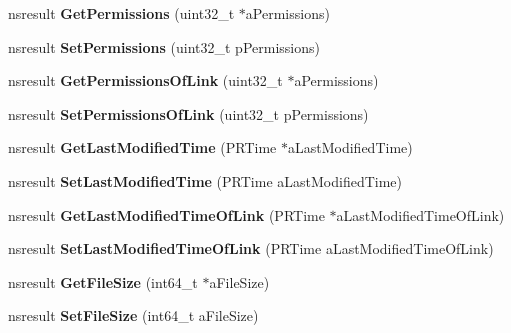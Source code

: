 \begin{DoxyCompactItemize}
\item 
\mbox{\label{interfacens_i_file_adbab0d3ced90584edfca30fc212f0716}} 
nsresult {\bfseries Get\+Permissions} (uint32\+\_\+t $\ast$a\+Permissions)
\item 
\mbox{\label{interfacens_i_file_ab5b46f4da2f272e127a2f1a8dc68524d}} 
nsresult {\bfseries Set\+Permissions} (uint32\+\_\+t p\+Permissions)
\item 
\mbox{\label{interfacens_i_file_a0657ef6dbcecd56e530e410ac0842438}} 
nsresult {\bfseries Get\+Permissions\+Of\+Link} (uint32\+\_\+t $\ast$a\+Permissions)
\item 
\mbox{\label{interfacens_i_file_aeed56ce8dd56464e30c66a38de735c31}} 
nsresult {\bfseries Set\+Permissions\+Of\+Link} (uint32\+\_\+t p\+Permissions)
\item 
\mbox{\label{interfacens_i_file_a9ac3d22e3d07148925df011857117a43}} 
nsresult {\bfseries Get\+Last\+Modified\+Time} (P\+R\+Time $\ast$a\+Last\+Modified\+Time)
\item 
\mbox{\label{interfacens_i_file_ababe92f89df28490b61cc584898d02a1}} 
nsresult {\bfseries Set\+Last\+Modified\+Time} (P\+R\+Time a\+Last\+Modified\+Time)
\item 
\mbox{\label{interfacens_i_file_a78799e23265cf32eaf2bbd5ed9007ae4}} 
nsresult {\bfseries Get\+Last\+Modified\+Time\+Of\+Link} (P\+R\+Time $\ast$a\+Last\+Modified\+Time\+Of\+Link)
\item 
\mbox{\label{interfacens_i_file_a13cb4a875feb91ef671fc3f360a383e1}} 
nsresult {\bfseries Set\+Last\+Modified\+Time\+Of\+Link} (P\+R\+Time a\+Last\+Modified\+Time\+Of\+Link)
\item 
\mbox{\label{interfacens_i_file_a6e9cd0e3ca56133067ba03ff8f2b56cd}} 
nsresult {\bfseries Get\+File\+Size} (int64\+\_\+t $\ast$a\+File\+Size)
\item 
\mbox{\label{interfacens_i_file_a02cda8b0d22e2bd9c4e6df4cd38d41cb}} 
nsresult {\bfseries Set\+File\+Size} (int64\+\_\+t a\+File\+Size)

\end{DoxyCompactItemize}
